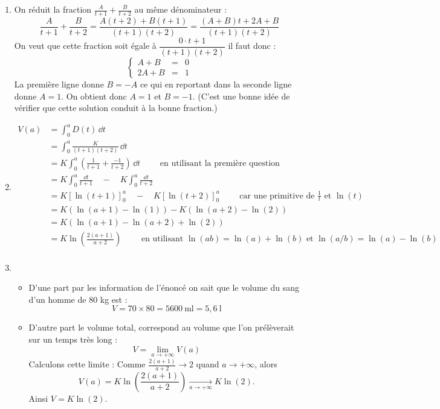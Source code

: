 \documentclass[11pt,class=report,crop=false]{standalone}
\begin{document}
\sauteligne
\begin{enumerate}
  \item 
On réduit la fraction $\frac{A}{t+1} + \frac{B}{t+2}$ au même dénominateur :
$$\frac{A}{t+1} + \frac{B}{t+2} = \frac{A(t+2) + B(t+1)}{(t+1)(t+2)} = \frac{(A+B)t  + 2A+B}{(t+1)(t+2)}$$
On veut que cette fraction soit égale à $\dfrac{0\cdot t + 1}{(t+1)(t+2)}$ il faut donc :
$$\left\{\begin{array}{rcl}
A+B    &=& 0 \\
2A + B &=& 1
\end{array}\right.$$
La première ligne donne $B=-A$ ce qui en reportant dans la seconde ligne donne $A=1$. On obtient donc $A=1$ et $B=-1$. 
(C'est une bonne idée de vérifier que cette solution conduit à la bonne fraction.)


  \item 
\begin{align*}
V(a)
  &= \int_0^a D(t)\,\dd t \\
  &=  \int_0^a \frac{K}{(t+1)(t+2)} \,\dd t \\
  &=  K \int_0^a \left(\frac{1}{t+1} + \frac{-1}{t+2} \right) \,\dd t \qquad \text{ en utilisant la première question} \\
  &=  K \int_0^a \frac{\dd t}{t+1} \quad - \quad K \int_0^a \frac{\dd t}{t+2} \\
  &=  K \left[ \ln(t+1) \right]_0^a  \quad - \quad  K \left[ \ln(t+2) \right]_0^a \qquad \text{ car une primitive de $\frac1t$ et $\ln(t)$ }\\
  &=  K \left( \ln(a+1)-\ln(1) \right)  - K \left( \ln(a+2) - \ln(2) \right) \\
  &=  K \left( \ln(a+1) - \ln(a+2) + \ln(2) \right) \\
  &=  K \ln\left( \frac{2(a+1)}{a+2} \right) \qquad \text{ en utilisant } \ln(ab)=\ln(a)+\ln(b) \text{ et } \ln(a/b)=\ln(a)-\ln(b) \\
\end{align*}

  \item 
  \begin{itemize}
  \item D'une part par les information de l'énoncé on sait que le volume du sang d'un homme de 80 kg est :
$$V = 70 \times 80 = 5600~\text{ml} = 5,6~\text{l}$$

  \item D'autre part le volume total, correspond au volume que l'on prélèverait sur un temps très long :
  $$V = \lim_{a \to +\infty} V(a)$$
  Calculons cette limite :
  Comme $\frac{2(a+1)}{a+2} \to 2$ quand $a \to +\infty$, alors 
  $$V(a) = K \ln\left( \frac{2(a+1)}{a+2} \right) \xrightarrow[a \to +\infty]{} K\ln(2).$$
  Ainsi $V = K \ln(2)$.


\end{itemize}
\end{enumerate}
\end{document}
